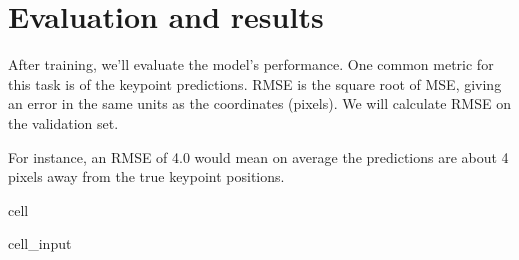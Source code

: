 \documentclass[letterpaper,10pt,english]{jupyterBook}
\begin{document}
\section{Evaluation and results}
\label{\detokenize{04:evaluation-and-results}}
\sphinxAtStartPar
After training, we’ll evaluate the model’s performance. One common metric for this task is  of the keypoint predictions. RMSE is the square root of MSE, giving an error in the same units as the coordinates (pixels). We will calculate RMSE on the validation set.

\sphinxAtStartPar
For instance, an RMSE of 4.0 would mean on average the predictions are about 4 pixels away from the true keypoint positions.

\begin{sphinxuseclass}{cell}\begin{sphinxVerbatimInput}

\begin{sphinxuseclass}{cell_input}
\begin{sphinxVerbatim}[commandchars=\\\{\}]

 
      

    
    
  
\end{sphinxVerbatim}


\end{sphinxuseclass}
\end{sphinxVerbatimInput}
\end{sphinxuseclass}
\end{document}
